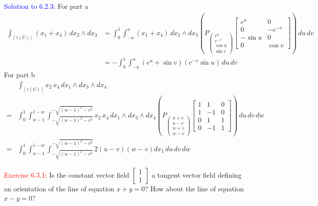\documentclass[12pt]{article}
\begin{document}
{\textcolor{blue}{Solution to 6.2.3:}
For part a
\begin{align*}
    \int_{[\gamma(U)]} (x_1+x_4)\, dx_2 \wedge dx_3
    &= \int_0^1 \int_{-u}^u (x_1+x_4)\, dx_2 \wedge dx_3
        \left(
            P_{\begin{pmatrix}
                e^u \\ e^{-v} \\ \cos u \\ \sin v
            \end{pmatrix}}
            \begin{bmatrix}
                e^u & 0 \\
                0 & -e^{-v} \\
                -\sin u & 0\\
                0 & \cos v
            \end{bmatrix}
        \right) \,du \,dv\\
    &= -\int_0^1 \int_{-u}^u (e^u+\sin v)(e^{-v}\sin u) \,du \,dv
\end{align*}
For part b
\begin{align*}
    &\int_{[\gamma(U)]} x_2\, x_4\, dx_1 \wedge dx_3 \wedge dx_4 \\
    =& \int_0^1 \int_{w-1}^{1-w} \int_{-\sqrt{(w-1)^2-v^2}}^{-\sqrt{(w-1)^2-v^2}} 
        x_2\, x_4\, dx_1 \wedge dx_3 \wedge dx_4 
        \left(
            P_{\begin{pmatrix}
                u+v \\ u-v \\ w+v \\ w-v
            \end{pmatrix}}
            \begin{bmatrix}
                1 & 1 & 0\\
                1 & -1 & 0\\
                0 & 1 & 1\\
                0 & -1 & 1
            \end{bmatrix}
        \right) \,du \,dv \,dw \\
    =& \int_0^1 \int_{w-1}^{1-w} \int_{-\sqrt{(w-1)^2-v^2}}^{-\sqrt{(w-1)^2-v^2}} 
        2(u-v)(w-v) dx_1 \,du \,dv \,dw
\end{align*}
\newpage

\textcolor{red}{Exercise 6.3.1:}
Is the constant vector field $\begin{bmatrix}1\\1\end{bmatrix}$
a tangent vector field defining an orientation of the line of equation $x+y=0$?
How about the line of equation $x-y=0$?
\smallskip

}
\end{document}
